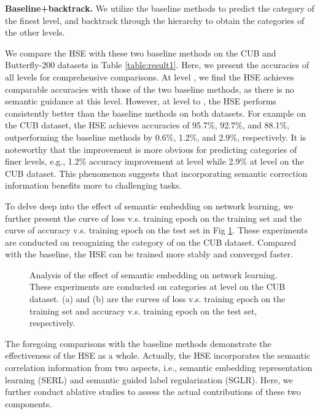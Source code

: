 \documentclass[sigconf]{acmart}
\begin{document}
\noindent\textbf{Baseline+backtrack. }We utilize the baseline methods to predict the category of the finest level, and backtrack through the hierarchy to obtain the categories of the other levels. 

We compare the HSE with these two baseline methods on the CUB and Butterfly-200 datasets in Table \ref{table:result1}. Here, we present the accuracies of all levels for comprehensive comparisons. At level , we find the HSE achieves comparable accuracies with those of the two baseline methods, as there is no semantic guidance at this level. However, at level  to , the HSE performs consistently better than the baseline methods on both datasets. For example on the CUB dataset, the HSE achieves accuracies of 95.7\%, 92.7\%, and 88.1\%, outperforming the baseline methods by 0.6\%, 1.2\%, and 2.9\%, respectively. It is noteworthy that the improvement is more obvious for predicting categories of finer levels, e.g., 1.2\% accuracy improvement at level  while 2.9\% at level  on the CUB dataset. This phenomenon suggests that incorporating semantic correction information benefits more to challenging tasks.

To delve deep into the effect of semantic embedding on network learning, we further present the curve of loss v.s. training epoch on the training set and the curve of accuracy v.s. training epoch on the test set in Fig \ref{fig:training-curve}. These experiments are conducted on recognizing the category of  on the CUB dataset. Compared with the baseline, the HSE can be trained more stably and converged faster.


 \begin{figure}[!t]
 \centering
 \caption{Analysis of the effect of semantic embedding on network learning. These experiments are conducted on categories at level  on the CUB dataset. (a) and (b) are the curves of loss v.s. training epoch on the training set and accuracy v.s. training epoch on the test set, respectively.}
 \label{fig:training-curve}
 \end{figure}

The foregoing comparisons with the baseline methods demonstrate the effectiveness of the HSE as a whole. Actually, the HSE incorporates the semantic correlation information from two aspects, i.e., semantic embedding representation learning (SERL) and semantic guided label regularization (SGLR). Here, we further conduct ablative studies to assess the actual contributions of these two components. 
\end{document}
